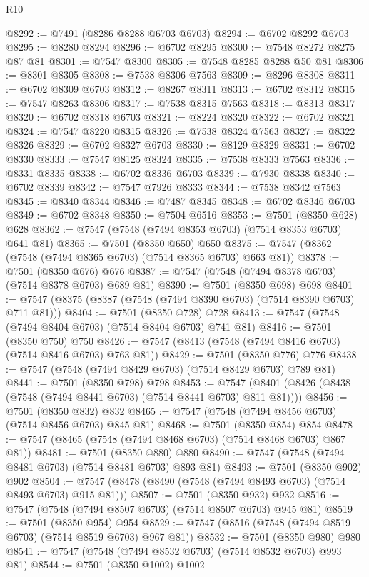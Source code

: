 \begin{lexlean}{R10}
\begin{coremodule}
@8292 := @7491 (@8286 @8288 @6703 @6703)
@8294 := @6702 @8292 @6703
@8295 := @8280 @8294
@8296 := @6702 @8295
@8300 := @7548 @8272 @8275 @87 @81
@8301 := @7547 @8300
@8305 := @7548 @8285 @8288 @50 @81
@8306 := @8301 @8305
@8308 := @7538 @8306 @7563
@8309 := @8296 @8308
@8311 := @6702 @8309 @6703
@8312 := @8267 @8311
@8313 := @6702 @8312
@8315 := @7547 @8263 @8306
@8317 := @7538 @8315 @7563
@8318 := @8313 @8317
@8320 := @6702 @8318 @6703
@8321 := @8224 @8320
@8322 := @6702 @8321
@8324 := @7547 @8220 @8315
@8326 := @7538 @8324 @7563
@8327 := @8322 @8326
@8329 := @6702 @8327 @6703
@8330 := @8129 @8329
@8331 := @6702 @8330
@8333 := @7547 @8125 @8324
@8335 := @7538 @8333 @7563
@8336 := @8331 @8335
@8338 := @6702 @8336 @6703
@8339 := @7930 @8338
@8340 := @6702 @8339
@8342 := @7547 @7926 @8333
@8344 := @7538 @8342 @7563
@8345 := @8340 @8344
@8346 := @7487 @8345
@8348 := @6702 @8346 @6703
@8349 := @6702 @8348
@8350 := @7504 @6516
@8353 := @7501 (@8350 @628) @628
@8362 := @7547 (@7548 (@7494 @8353 @6703) (@7514 @8353 @6703) @641 @81)
@8365 := @7501 (@8350 @650) @650
@8375 := @7547 (@8362 (@7548 (@7494 @8365 @6703) (@7514 @8365 @6703) @663 @81))
@8378 := @7501 (@8350 @676) @676
@8387 := @7547 (@7548 (@7494 @8378 @6703) (@7514 @8378 @6703) @689 @81)
@8390 := @7501 (@8350 @698) @698
@8401 := @7547 (@8375 (@8387 (@7548 (@7494 @8390 @6703) (@7514 @8390 @6703) @711 @81)))
@8404 := @7501 (@8350 @728) @728
@8413 := @7547 (@7548 (@7494 @8404 @6703) (@7514 @8404 @6703) @741 @81)
@8416 := @7501 (@8350 @750) @750
@8426 := @7547 (@8413 (@7548 (@7494 @8416 @6703) (@7514 @8416 @6703) @763 @81))
@8429 := @7501 (@8350 @776) @776
@8438 := @7547 (@7548 (@7494 @8429 @6703) (@7514 @8429 @6703) @789 @81)
@8441 := @7501 (@8350 @798) @798
@8453 := @7547 (@8401 (@8426 (@8438 (@7548 (@7494 @8441 @6703) (@7514 @8441 @6703) @811 @81))))
@8456 := @7501 (@8350 @832) @832
@8465 := @7547 (@7548 (@7494 @8456 @6703) (@7514 @8456 @6703) @845 @81)
@8468 := @7501 (@8350 @854) @854
@8478 := @7547 (@8465 (@7548 (@7494 @8468 @6703) (@7514 @8468 @6703) @867 @81))
@8481 := @7501 (@8350 @880) @880
@8490 := @7547 (@7548 (@7494 @8481 @6703) (@7514 @8481 @6703) @893 @81)
@8493 := @7501 (@8350 @902) @902
@8504 := @7547 (@8478 (@8490 (@7548 (@7494 @8493 @6703) (@7514 @8493 @6703) @915 @81)))
@8507 := @7501 (@8350 @932) @932
@8516 := @7547 (@7548 (@7494 @8507 @6703) (@7514 @8507 @6703) @945 @81)
@8519 := @7501 (@8350 @954) @954
@8529 := @7547 (@8516 (@7548 (@7494 @8519 @6703) (@7514 @8519 @6703) @967 @81))
@8532 := @7501 (@8350 @980) @980
@8541 := @7547 (@7548 (@7494 @8532 @6703) (@7514 @8532 @6703) @993 @81)
@8544 := @7501 (@8350 @1002) @1002

\end{coremodule}
\end{lexlean}
